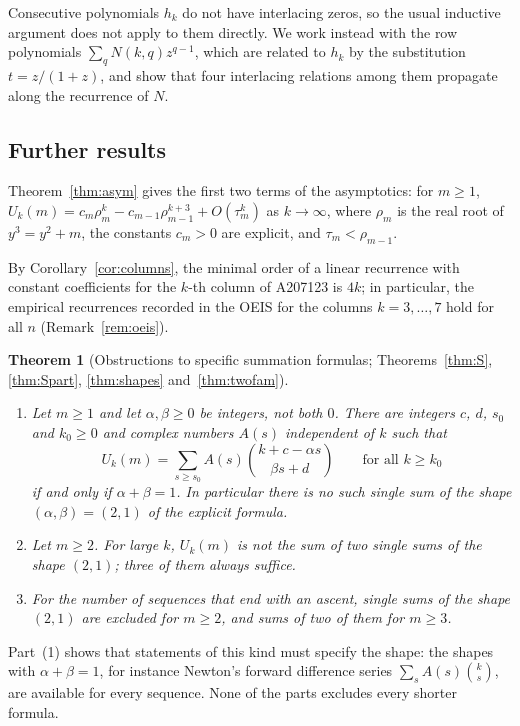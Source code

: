 \documentclass[11pt]{amsart}
\newtheorem{introthm}{Theorem}
\theoremstyle{definition}
\begin{document}
Consecutive polynomials $h_k$ do not have interlacing zeros, so the usual inductive argument does not apply to them directly. We work instead with the row polynomials $\sum_qN(k,q)z^{q-1}$, which are related to $h_k$ by the substitution $t=z/(1+z)$, and show that four interlacing relations among them propagate along the recurrence of $N$.

\subsection{Further results}\label{sec:further}
Theorem~\ref{thm:asym} gives the first two terms of the asymptotics: for $m\ge1$, $U_k(m)=c_m\rho_m^k-c_{m-1}\rho_{m-1}^{k+3}+O(\tau_m^k)$ as $k\to\infty$, where $\rho_m$ is the real root of $y^3=y^2+m$, the constants $c_m>0$ are explicit, and $\tau_m<\rho_{m-1}$.

By Corollary~\ref{cor:columns}, the minimal order of a linear recurrence with constant coefficients for the $k$-th column of A207123 is $4k$; in particular, the empirical recurrences recorded in the OEIS for the columns $k=3,\dots,7$ hold for all $n$ (Remark~\ref{rem:oeis}).

\begin{introthm}[Obstructions to specific summation formulas; Theorems~\ref{thm:S}, \ref{thm:Spart}, \ref{thm:shapes} and~\ref{thm:twofam}]\label{intro:shapes}\leavevmode
\begin{enumerate}
\item Let $m\ge1$ and let $\alpha,\beta\ge0$ be integers, not both $0$. There are integers $c$, $d$, $s_0$ and $k_0\ge0$ and complex numbers $A(s)$ independent of $k$ such that
\[
  U_k(m)=\sum_{s\ge s_0} A(s)\binom{k+c-\alpha s}{\beta s+d}\qquad\text{for all }k\ge k_0
\]
if and only if $\alpha+\beta=1$. In particular there is no such single sum of the shape $(\alpha,\beta)=(2,1)$ of the explicit formula.
\item Let $m\ge2$. For large $k$, $U_k(m)$ is not the sum of two single sums of the shape $(2,1)$; three of them always suffice.
\item For the number of sequences that end with an ascent, single sums of the shape $(2,1)$ are excluded for $m\ge2$, and sums of two of them for $m\ge3$.
\end{enumerate}
\end{introthm}

Part~(1) shows that statements of this kind must specify the shape: the shapes with $\alpha+\beta=1$, for instance Newton's forward difference series $\sum_sA(s)\binom{k}{s}$, are available for every sequence. None of the parts excludes every shorter formula.
\end{document}
